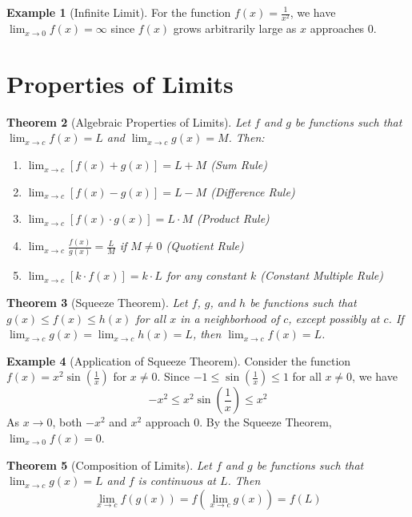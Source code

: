 \documentclass[12pt,a4paper]{article}
\theoremstyle{plain}
\newtheorem{theorem}{Theorem}[section]
\theoremstyle{definition}
\newtheorem{example}[theorem]{Example}
\begin{document}
\begin{example}[Infinite Limit]
For the function $f(x) = \frac{1}{x^2}$, we have $\lim_{x \to 0} f(x) = \infty$ since $f(x)$ grows arbitrarily large as $x$ approaches 0.
\end{example}

\section{Properties of Limits}

\begin{theorem}[Algebraic Properties of Limits]
Let $f$ and $g$ be functions such that $\lim_{x \to c} f(x) = L$ and $\lim_{x \to c} g(x) = M$. Then:
\begin{enumerate}[label=(\roman*)]
\item $\lim_{x \to c} [f(x) + g(x)] = L + M$ (Sum Rule)
\item $\lim_{x \to c} [f(x) - g(x)] = L - M$ (Difference Rule)
\item $\lim_{x \to c} [f(x) \cdot g(x)] = L \cdot M$ (Product Rule)
\item $\lim_{x \to c} \frac{f(x)}{g(x)} = \frac{L}{M}$ if $M \neq 0$ (Quotient Rule)
\item $\lim_{x \to c} [k \cdot f(x)] = k \cdot L$ for any constant $k$ (Constant Multiple Rule)
\end{enumerate}
\end{theorem}

\begin{theorem}[Squeeze Theorem]
Let $f$, $g$, and $h$ be functions such that $g(x) \leq f(x) \leq h(x)$ for all $x$ in a neighborhood of $c$, except possibly at $c$. If $\lim_{x \to c} g(x) = \lim_{x \to c} h(x) = L$, then $\lim_{x \to c} f(x) = L$.
\end{theorem}

\begin{example}[Application of Squeeze Theorem]
Consider the function $f(x) = x^2 \sin\left(\frac{1}{x}\right)$ for $x \neq 0$. Since $-1 \leq \sin\left(\frac{1}{x}\right) \leq 1$ for all $x \neq 0$, we have
\begin{equation}
-x^2 \leq x^2 \sin\left(\frac{1}{x}\right) \leq x^2
\end{equation}
As $x \to 0$, both $-x^2$ and $x^2$ approach 0. By the Squeeze Theorem, $\lim_{x \to 0} f(x) = 0$.
\end{example}

\begin{theorem}[Composition of Limits]
Let $f$ and $g$ be functions such that $\lim_{x \to c} g(x) = L$ and $f$ is continuous at $L$. Then
\begin{equation}
\lim_{x \to c} f(g(x)) = f\left(\lim_{x \to c} g(x)\right) = f(L)
\end{equation}
\end{theorem}
\end{document}
